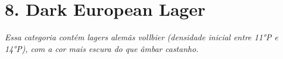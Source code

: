 \section*{8. Dark European Lager}
\textit{Essa categoria contém lagers alemãs vollbier (densidade inicial entre 11°P e 14°P), com a cor mais escura do que âmbar castanho.}
